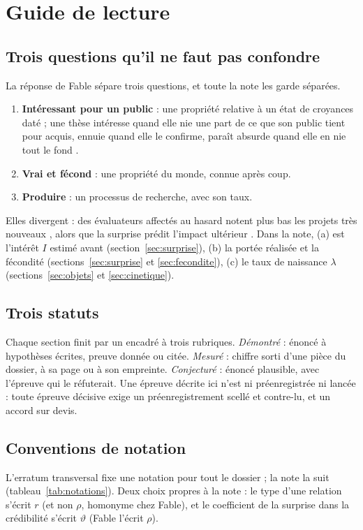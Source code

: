 \documentclass[11pt,a4paper]{article}
\theoremstyle{definition}
\theoremstyle{plain}
\begin{document}
\tableofcontents

\section{Guide de lecture}
\label{sec:guide}

\subsection{Trois questions qu'il ne faut pas confondre}
La réponse de Fable \cite{fable} sépare trois questions, et toute la note les garde séparées.
\begin{enumerate}[label=(\alph*)]
\item \textbf{Intéressant pour un public} : une propriété relative à un état de croyances daté ;
une thèse intéresse quand elle nie une part de ce que son public tient pour acquis, ennuie quand
elle le confirme, paraît absurde quand elle en nie tout le fond \cite{davis1971}.
\item \textbf{Vrai et fécond} : une propriété du monde, connue après coup.
\item \textbf{Produire} : un processus de recherche, avec son taux.
\end{enumerate}
Elles divergent : des évaluateurs affectés au hasard notent plus bas les projets très
nouveaux \cite{boudreau2016}, alors que la surprise prédit l'impact ultérieur
\cite{shievans2023}. Dans la note, (a) est l'intérêt $I$ estimé avant (section~\ref{sec:surprise}),
(b) la portée réalisée et la fécondité (sections~\ref{sec:surprise} et \ref{sec:fecondite}), (c) le
taux de naissance $\lambda$ (sections~\ref{sec:objets} et \ref{sec:cinetique}).

\subsection{Trois statuts}
Chaque section finit par un encadré à trois rubriques. \emph{Démontré} : énoncé à hypothèses
écrites, preuve donnée ou citée. \emph{Mesuré} : chiffre sorti d'une pièce du dossier, à sa page
ou à son empreinte. \emph{Conjecturé} : énoncé plausible, avec l'épreuve qui le réfuterait. Une
épreuve décrite ici n'est ni préenregistrée ni lancée : toute épreuve décisive exige un
préenregistrement scellé et contre-lu, et un accord sur devis.

\subsection{Conventions de notation}
L'erratum transversal \cite{erratumkappa} fixe une notation pour tout le dossier ; la note la suit
(tableau~\ref{tab:notations}). Deux choix propres à la note : le type d'une relation s'écrit $r$
(et non $\rho$, homonyme chez Fable), et le coefficient de la surprise dans la crédibilité s'écrit
$\vartheta$ (Fable l'écrit $\rho$).
\end{document}
